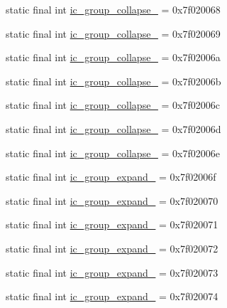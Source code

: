 \begin{CompactItemize}
\item 
static final int \hyperlink{classandroid_1_1support_1_1v4_1_1_r_1_1drawable_ff2877f3216221aff0569e951bdeba29}{ic\_\-group\_\-collapse\_} = 0x7f020068
\item 
static final int \hyperlink{classandroid_1_1support_1_1v4_1_1_r_1_1drawable_7867961cd80cd9ee43825ad21c920d68}{ic\_\-group\_\-collapse\_} = 0x7f020069
\item 
static final int \hyperlink{classandroid_1_1support_1_1v4_1_1_r_1_1drawable_a7faf650f6c37957d8541c7b2a8aedc7}{ic\_\-group\_\-collapse\_} = 0x7f02006a
\item 
static final int \hyperlink{classandroid_1_1support_1_1v4_1_1_r_1_1drawable_32ee0e3c09fc59b2ede453fe57d07266}{ic\_\-group\_\-collapse\_} = 0x7f02006b
\item 
static final int \hyperlink{classandroid_1_1support_1_1v4_1_1_r_1_1drawable_097c44a52cfe30853873554f48c765cb}{ic\_\-group\_\-collapse\_} = 0x7f02006c
\item 
static final int \hyperlink{classandroid_1_1support_1_1v4_1_1_r_1_1drawable_5a0bfd4daf94ef1fbbb1bd8400dbc09a}{ic\_\-group\_\-collapse\_} = 0x7f02006d
\item 
static final int \hyperlink{classandroid_1_1support_1_1v4_1_1_r_1_1drawable_472b8ac8761cff0c74a8d130396ac824}{ic\_\-group\_\-collapse\_} = 0x7f02006e
\item 
static final int \hyperlink{classandroid_1_1support_1_1v4_1_1_r_1_1drawable_e7a2870f8098ec3f941af43ce1220202}{ic\_\-group\_\-expand\_} = 0x7f02006f
\item 
static final int \hyperlink{classandroid_1_1support_1_1v4_1_1_r_1_1drawable_fdfc67d0653da1b17fa56b882e8fb0ef}{ic\_\-group\_\-expand\_} = 0x7f020070
\item 
static final int \hyperlink{classandroid_1_1support_1_1v4_1_1_r_1_1drawable_c728c9ee8bcf178ed1464eb94c52c560}{ic\_\-group\_\-expand\_} = 0x7f020071
\item 
static final int \hyperlink{classandroid_1_1support_1_1v4_1_1_r_1_1drawable_be9360c6a90f0a8e88d59de0c5054143}{ic\_\-group\_\-expand\_} = 0x7f020072
\item 
static final int \hyperlink{classandroid_1_1support_1_1v4_1_1_r_1_1drawable_29ff015359d196ee71353bf477c07966}{ic\_\-group\_\-expand\_} = 0x7f020073
\item 
static final int \hyperlink{classandroid_1_1support_1_1v4_1_1_r_1_1drawable_a9d3a09a0bf928ce534064973a975839}{ic\_\-group\_\-expand\_} = 0x7f020074

\end{CompactItemize}
